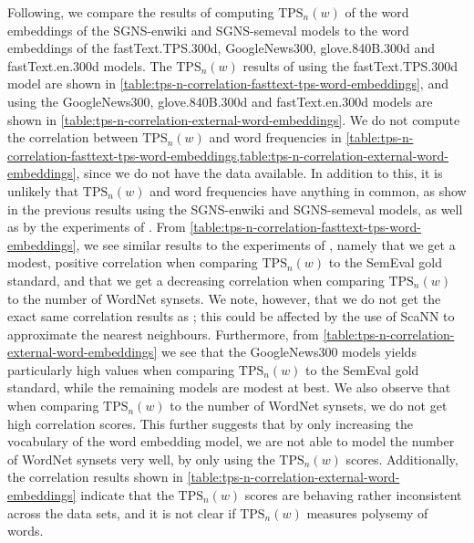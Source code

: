 
Following, we compare the results of computing $\text{TPS}_n(w)$ of the word embeddings of the SGNS-enwiki and SGNS-semeval models to the word embeddings of the fastText.TPS.300d, GoogleNews300, glove.840B.300d and fastText.en.300d models. The $\text{TPS}_n(w)$ results of using the fastText.TPS.300d model are shown in \cref{table:tps-n-correlation-fasttext-tps-word-embeddings}, and using the GoogleNews300, glove.840B.300d and fastText.en.300d models are shown in \cref{table:tps-n-correlation-external-word-embeddings}. We do not compute the correlation between $\text{TPS}_n(w)$ and word frequencies in \cref{table:tps-n-correlation-fasttext-tps-word-embeddings,table:tps-n-correlation-external-word-embeddings}, since we do not have the data available. In addition to this, it is unlikely that $\text{TPS}_n(w)$ and word frequencies have anything in common, as show in the previous results using the SGNS-enwiki and SGNS-semeval models, as well as by the experiments of \cite{jakubowski2020topology}. From \cref{table:tps-n-correlation-fasttext-tps-word-embeddings}, we see similar results to the experiments of \cite{jakubowski2020topology}, namely that we get a modest, positive correlation when comparing $\text{TPS}_n(w)$ to the SemEval gold standard, and that we get a decreasing correlation when comparing $\text{TPS}_n(w)$ to the number of WordNet synsets. We note, however, that we do not get the exact same correlation results as \cite{jakubowski2020topology}; this could be affected by the use of ScaNN to approximate the nearest neighbours. Furthermore, from \cref{table:tps-n-correlation-external-word-embeddings} we see that the GoogleNews300 models yields particularly high values when comparing $\text{TPS}_n(w)$ to the SemEval gold standard, while the remaining models are modest at best. We also observe that when comparing $\text{TPS}_n(w)$ to the number of WordNet synsets, we do not get high correlation scores. This further suggests that by only increasing the vocabulary of the word embedding model, we are not able to model the number of WordNet synsets very well, by only using the $\text{TPS}_n(w)$ scores. Additionally, the correlation results shown in \cref{table:tps-n-correlation-external-word-embeddings} indicate that the $\text{TPS}_n(w)$ scores are behaving rather inconsistent across the data sets, and it is not clear if $\text{TPS}_n(w)$ measures polysemy of words.
